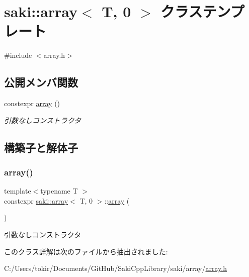 \hypertarget{classsaki_1_1array_3_01_t_00_010_01_4}{}\section{saki\+:\+:array$<$ T, 0 $>$ クラステンプレート}
\label{classsaki_1_1array_3_01_t_00_010_01_4}


{\ttfamily \#include $<$array.\+h$>$}

\subsection*{公開メンバ関数}
\begin{DoxyCompactItemize}
\item 
constexpr \mbox{\hyperlink{classsaki_1_1array_3_01_t_00_010_01_4_ad873a55991e1ca757805bae4aaa3786d}{array}} ()
\begin{DoxyCompactList}\small\item\em 引数なしコンストラクタ \end{DoxyCompactList}\end{DoxyCompactItemize}


\subsection{構築子と解体子}
\mbox{\label{classsaki_1_1array_3_01_t_00_010_01_4_ad873a55991e1ca757805bae4aaa3786d}} 
\subsubsection{\texorpdfstring{array()}{array()}}
{\footnotesize\ttfamily template$<$typename T $>$ \\
constexpr \mbox{\hyperlink{classsaki_1_1array}{saki\+::array}}$<$ T, 0 $>$\+::\mbox{\hyperlink{classsaki_1_1array}{array}} (\begin{DoxyParamCaption}{ }\end{DoxyParamCaption})\hspace{0.3cm}{\ttfamily [inline]}}



引数なしコンストラクタ 



このクラス詳解は次のファイルから抽出されました\+:\begin{DoxyCompactItemize}
\item 
C\+:/\+Users/tokir/\+Documents/\+Git\+Hub/\+Saki\+Cpp\+Library/saki/array/\mbox{\hyperlink{array_2array_8h}{array.\+h}}\end{DoxyCompactItemize}
